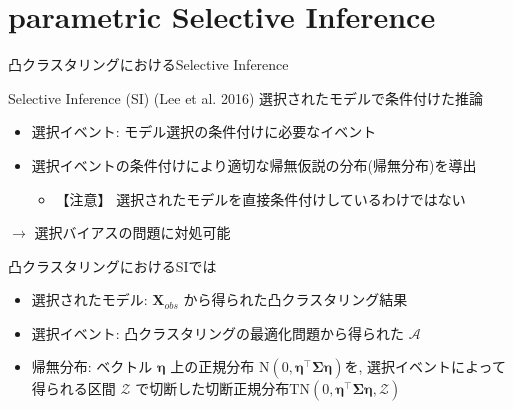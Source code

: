 \documentclass[dvipdfmx, 10pt]{beamer}
\newcommand{\zl}{\rightarrow}
\begin{document}

\section{parametric Selective Inference}


\begin{frame}{凸クラスタリングにおけるSelective Inference}

    \begin{block}{Selective Inference (SI) (Lee et al. 2016\cite{lee2016exact})}
        選択されたモデルで条件付けた推論
        \begin{itemize}
            \item 選択イベント: モデル選択の条件付けに必要なイベント
            \item 選択イベントの条件付けにより適切な帰無仮説の分布(帰無分布)を導出
            \begin{itemize}
                \item \alert{【注意】} 選択されたモデルを直接条件付けしているわけではない
            \end{itemize}
        \end{itemize}
        $\zl$ 選択バイアスの問題に対処可能
    \end{block}

    凸クラスタリングにおけるSIでは
    \begin{itemize}
        \item 選択されたモデル: $\bm{X}_{obs}$ から得られた凸クラスタリング結果
        \item 選択イベント: 凸クラスタリングの最適化問題から得られた $\mathcal{A}$
        \item 帰無分布: ベクトル $\bm{\eta}$ 上の正規分布 $\mathrm{N}(0, \bm{\eta}^{\top} \bm{\Sigma} \bm{\eta})$を, 選択イベントによって得られる区間 $\mathcal{Z}$ で切断した切断正規分布$\mathrm{T}\mathrm{N}(0, \bm{\eta}^{\top} \bm{\Sigma} \bm{\eta}, \mathcal{Z})$
    \end{itemize}

\end{frame}

\end{document}
